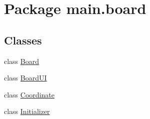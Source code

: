 \hypertarget{namespacemain_1_1board}{}\section{Package main.\+board}
\label{namespacemain_1_1board}
\subsection*{Classes}
\begin{DoxyCompactItemize}
\item 
class \hyperlink{classmain_1_1board_1_1_board}{Board}
\item 
class \hyperlink{classmain_1_1board_1_1_board_u_i}{Board\+UI}
\item 
class \hyperlink{classmain_1_1board_1_1_coordinate}{Coordinate}
\item 
class \hyperlink{classmain_1_1board_1_1_initializer}{Initializer}
\end{DoxyCompactItemize}
